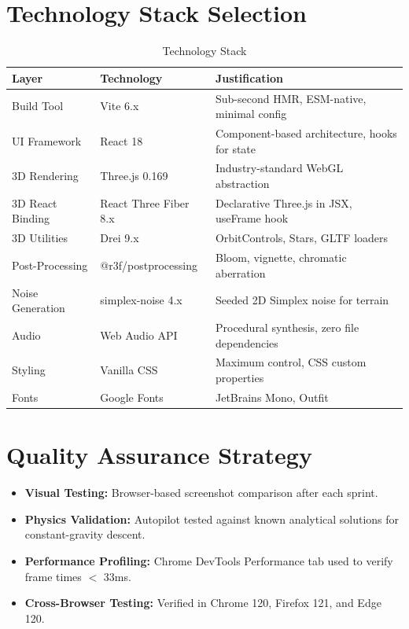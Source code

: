 \section{Technology Stack Selection}

\begin{table}[h]
\centering
\caption{Technology Stack}
\label{tab:techstack}
\begin{tabular}{|p{3cm}|p{3.5cm}|p{6cm}|}
\hline
\textbf{Layer} & \textbf{Technology} & \textbf{Justification} \\
\hline
Build Tool & Vite 6.x & Sub-second HMR, ESM-native, minimal config \\
\hline
UI Framework & React 18 & Component-based architecture, hooks for state \\
\hline
3D Rendering & Three.js 0.169 & Industry-standard WebGL abstraction \\
\hline
3D React Binding & React Three Fiber 8.x & Declarative Three.js in JSX, useFrame hook \\
\hline
3D Utilities & Drei 9.x & OrbitControls, Stars, GLTF loaders \\
\hline
Post-Processing & @r3f/postprocessing & Bloom, vignette, chromatic aberration \\
\hline
Noise Generation & simplex-noise 4.x & Seeded 2D Simplex noise for terrain \\
\hline
Audio & Web Audio API & Procedural synthesis, zero file dependencies \\
\hline
Styling & Vanilla CSS & Maximum control, CSS custom properties \\
\hline
Fonts & Google Fonts & JetBrains Mono, Outfit \\
\hline
\end{tabular}
\end{table}

\section{Quality Assurance Strategy}
\begin{itemize}
    \item \textbf{Visual Testing:} Browser-based screenshot comparison after each sprint.
    \item \textbf{Physics Validation:} Autopilot tested against known analytical solutions for constant-gravity descent.
    \item \textbf{Performance Profiling:} Chrome DevTools Performance tab used to verify frame times $<$ 33ms.
    \item \textbf{Cross-Browser Testing:} Verified in Chrome 120, Firefox 121, and Edge 120.
\end{itemize}

